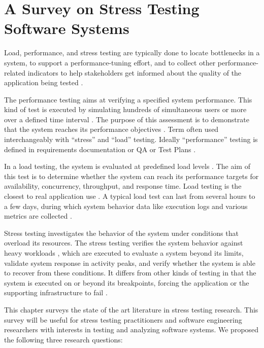 \chapter{A Survey on Stress Testing Software Systems}

Load, performance, and stress testing are typically done to locate bottlenecks in a system, to support a performance-tuning effort, and to collect other performance-related indicators to help stakeholders get informed about the quality of the application being tested \cite{Sandler2004} \cite{Corporation2007}. 


The performance testing aims at verifying a specified system performance. This kind of test is executed by simulating hundreds of simultaneous users or more over a defined time interval \cite{DiLucca2006}. The purpose of this assessment is to demonstrate that the system reaches its performance objectives \cite{Sandler2004}.  Term often used interchangeably with “stress” and “load” testing. Ideally “performance” testing is defined in requirements documentation or QA or Test Plans \cite{Lewis2005}.


In a load testing, the system is evaluated at predefined load levels \cite{DiLucca2006}. The aim of this test is to determine whether the system can reach its performance targets for availability, concurrency, throughput, and response time. Load testing is the closest to real application use \cite{Molyneaux2009}. A typical load test can last from several hours to a few days, during which system behavior data like execution logs and various metrics are collected \cite{Afzal2009a}. 

Stress testing investigates the behavior of the system under conditions
that overload its resources. The stress testing verifies the system behavior against heavy workloads \cite{Sandler2004} \cite{Lewis2005}, which are executed to evaluate a system beyond its limits, validate system response in activity peaks, and verify whether the system is able to recover from these conditions. It differs from other kinds of testing in that the system is executed on or beyond its breakpoints, forcing the application or the supporting infrastructure to fail \cite{DiLucca2006} \cite{Molyneaux2009}.


This chapter surveys the state of the art literature in stress testing research. This survey will be useful for stress testing practitioners and software engineering researchers with interests in testing and analyzing software systems. We proposed the following three research questions:


